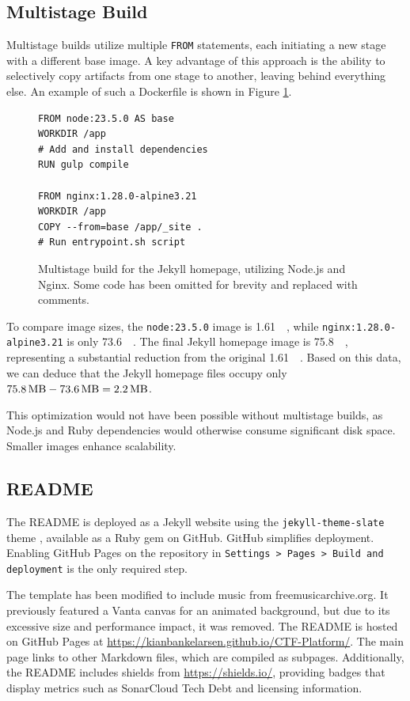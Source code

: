 \subsection{Multistage Build}
Multistage builds utilize multiple \texttt{FROM} statements, each initiating a new stage with a different base image. A key advantage of this approach is the ability to selectively copy artifacts from one stage to another, leaving behind everything else. An example of such a Dockerfile is shown in Figure \ref{fig:multistage_build}.

\begin{figure}[h]
    \centering
\begin{verbatim}
FROM node:23.5.0 AS base
WORKDIR /app
# Add and install dependencies
RUN gulp compile

FROM nginx:1.28.0-alpine3.21
WORKDIR /app
COPY --from=base /app/_site .
# Run entrypoint.sh script
\end{verbatim}
    \caption{Multistage build for the Jekyll homepage, utilizing Node.js and Nginx. Some code has been omitted for brevity and replaced with comments.}
    \label{fig:multistage_build}
\end{figure}

To compare image sizes, the \texttt{node:23.5.0} image is \SI{1.61}{\giga\byte}, while \texttt{nginx:1.28.0\allowbreak-alpine3.21} is only \SI{73.6}{\mega\byte}. The final Jekyll homepage image is \SI{75.8}{\mega\byte}, representing a substantial reduction from the original \SI{1.61}{\gibi\byte}. Based on this data, we can deduce that the Jekyll homepage files occupy only $\SI{75.8}{\mega\byte} - \SI{73.6}{\mega\byte} = \SI{2.2}{\mega\byte}$. 

This optimization would not have been possible without multistage builds, as Node.js and Ruby dependencies would otherwise consume significant disk space. Smaller images enhance scalability.

\subsection{README}
The README is deployed as a Jekyll website using the \texttt{jekyll-theme-slate} theme \parencite{slate_theme}, available as a Ruby gem on GitHub. GitHub simplifies deployment. Enabling GitHub Pages on the repository in \texttt{Settings > Pages > Build and deployment} is the only required step.

The template has been modified to include music from freemusicarchive.org. It previously featured a Vanta canvas for an animated background, but due to its excessive size and performance impact, it was removed. The README is hosted on GitHub Pages at \url{https://kianbankelarsen.github.io/CTF-Platform/}. The main page links to other Markdown files, which are compiled as subpages. Additionally, the README includes shields from \url{https://shields.io/}, providing badges that display metrics such as SonarCloud Tech Debt and licensing information.

